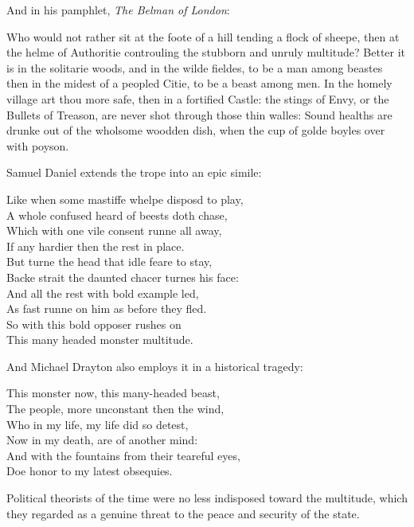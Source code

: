 And in his pamphlet, \emph{The Belman of London}:
\begin{bq}
Who would not rather sit at the foote of a hill tending a flock of sheepe, then at the helme of Authoritie controuling the stubborn and unruly multitude? Better it is in the solitarie woods, and in the wilde fieldes, to be a man among beastes then in the midest of a peopled Citie, to be a beast among men.
In the homely village art thou more safe, then in a fortified Castle: the stings of Envy, or the Bullets of Treason, are never shot through those thin walles: Sound healths are drunke out of the wholsome woodden dish, when the cup of golde boyles over with poyson.~\cite[sig. B3r]{dekker_belman_1608}
\end{bq}
Samuel Daniel extends the trope into an epic simile:
\begin{vq}
Like when some mastiffe whelpe disposd to play,\\
A whole confused heard of beests doth chase,\\
Which with one vile consent runne all away,\\
If any hardier then the rest in place.\\
But turne the head that idle feare to stay,\\
Backe strait the daunted chacer turnes his face:\\
And all the rest with bold example led,\\
As fast runne on him as before they fled.\\
So with this bold opposer rushes on\\
This many headed monster multitude.\\
\hfill\cite[464--465]{daniel_multitude_1600}
\end{vq}
And Michael Drayton also employs it in a historical tragedy:
\begin{vq}
This monster now, this many-headed beast,\\
The people, more unconstant then the wind,\\
Who in my life, my life did so detest,\\
Now in my death, are of another mind:\\
And with the fountains from their teareful eyes,\\
Doe honor to my latest obsequies.\\
\hfill\cite[sig. K2v]{drayton_peirs_1594}
\end{vq}
Political theorists of the time were no less indisposed toward the multitude, which they regarded as a genuine threat to the peace and security of the state.
